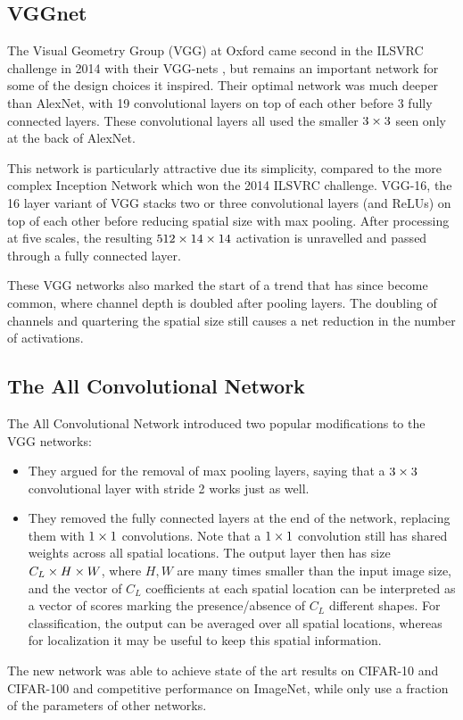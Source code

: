 \subsection{VGGnet}
The Visual Geometry Group (VGG) at Oxford came second in the ILSVRC challenge in
2014 with their VGG-nets \cite{simonyan_very_2014}, but remains an important
network for some of the design choices it inspired. Their optimal
network was much deeper than AlexNet, with 19 convolutional layers on top of
each other before 3 fully connected layers. These convolutional layers all used
the smaller $3\times 3$ seen only at the back of AlexNet.

This network is particularly attractive due its simplicity, compared to the 
more complex Inception Network \cite{szegedy_going_2015} which won the 2014
ILSVRC challenge. VGG-16, the 16 layer variant of VGG stacks two or three
convolutional layers (and ReLUs) on top of each other before reducing spatial
size with max pooling. After processing at five scales, the resulting $512 \times 14
\times 14$ activation is unravelled and passed through a fully connected layer.

These VGG networks also marked the start of a trend that has since become
common, where channel depth is doubled after pooling layers. The doubling of
channels and quartering the spatial size still causes a net reduction in the
number of activations.

\subsection{The All Convolutional Network}
The All Convolutional Network \cite{springenberg_striving_2014-3} introduced two
popular modifications to the VGG networks:
%
\begin{itemize}
  \item They argued for the removal of max pooling layers, saying that a $3\times 3$
    convolutional layer with stride 2 works just as well.
  \item They removed the fully connected layers at the end of the network,
    replacing them with $1\times 1$ convolutions. Note that a $1\times 1$ convolution
    still has shared weights across all spatial locations. The output layer then
    has size $C_L \times H \times W$, where $H, W$ are many times smaller than the input
    image size, and the vector of $C_L$ coefficients at each spatial location
    can be interpreted as a vector of scores marking the presence/absence of
    $C_L$ different shapes. For classification, the output can be averaged over
    all spatial locations, whereas for localization it may be useful to keep
    this spatial information.
\end{itemize}
The new network was able to achieve state of the art results on CIFAR-10 and
CIFAR-100 and competitive performance on ImageNet, while only use a fraction of
the parameters of other networks.

